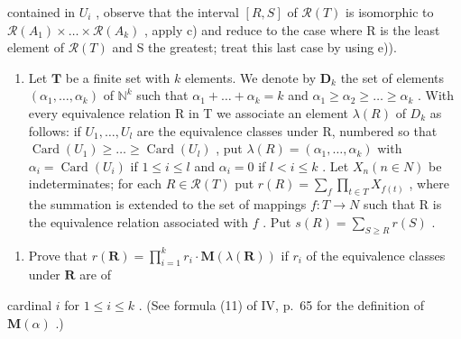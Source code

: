 contained in \(U_{i}\) , observe that the interval \([R, S]\) of \(\mathcal{R}(T)\) is isomorphic to \(\mathcal{R}(A_{1}) \times \ldots \times \mathcal{R}(A_{k})\) , apply c) and reduce to the case where R is the least element of \(\mathcal{R}(T)\) and S the greatest; treat this last case by using e)).

\begin{enumerate}
\def\labelenumi{\arabic{enumi})}
\setcounter{enumi}{14}
\tightlist
\item
  Let \(\mathbf{T}\) be a finite set with \(k\) elements. We denote by \(\mathbf{D}_k\) the set of elements \((\alpha_1, \ldots, \alpha_k)\) of \(\mathbb{N}^k\) such that \(\alpha_1 + \ldots + \alpha_k = k\) and \(\alpha_1 \geqslant \alpha_2 \geqslant \ldots \geqslant \alpha_k\) . With every equivalence relation R in T we associate an element \(\lambda(R)\) of \(D_k\) as follows: if \(U_1, \ldots, U_l\) are the equivalence classes under R, numbered so that \(\operatorname{Card}(U_1) \geqslant \ldots \geqslant \operatorname{Card}(U_l)\) , put \(\lambda(R) = (\alpha_1, \ldots, \alpha_k)\) with \(\alpha_i = \operatorname{Card}(U_i)\) if \(1 \leqslant i \leqslant l\) and \(\alpha_i = 0\) if \(l < i \leqslant k\) . Let \(X_n (n \in N)\) be indeterminates; for each \(R \in \mathcal{R}(T)\) put \(r(R) = \sum_{f} \prod_{t \in T} X_{f(t)}\) , where the summation is extended to the set of mappings \(f: T \to N\) such that R is the equivalence relation associated with \(f\) . Put \(s(R) = \sum_{S \geqslant R} r(S)\) .
\end{enumerate}

\begin{enumerate}
\def\labelenumi{\alph{enumi})}
\tightlist
\item
  Prove that \(r(\mathbf{R}) = \prod_{i=1}^{k} r_i \cdot \mathbf{M}(\lambda(\mathbf{R}))\) if \(r_i\) of the equivalence classes under \(\mathbf{R}\) are of
\end{enumerate}

cardinal \(i\) for \(1 \leqslant i \leqslant k\) . (See formula (11) of IV, p.~65 for the definition of \(\mathbf{M}(\alpha)\) .)

